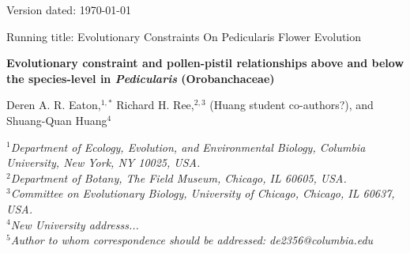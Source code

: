 \documentclass[12pt,letterpaper]{article}
\begin{document}
\begin{flushright}
Version dated: \today
\end{flushright}
\bigskip

\noindent Running title: Evolutionary Constraints On Pedicularis Flower Evolution \\

\begin{center}

{\Large \textbf{Evolutionary constraint and pollen-pistil 
relationships above and below the species-level in 
\emph{Pedicularis} (Orobanchaceae)}

\bigskip
\medskip

{\large Deren A. R. Eaton,$^{1,*}$
  Richard H. Ree,$^{2,3}$
  (Huang student co-authors?), and 
  Shuang-Quan Huang$^{4}$}}

\medskip
\end{center}

{\it \small
\noindent 
$^1$Department of Ecology, Evolution, and Environmental Biology, Columbia University, New York, NY 10025, USA. \\
\noindent $^2$Department of Botany, The Field Museum, Chicago, IL 60605, USA. \\
\noindent $^3$Committee on Evolutionary Biology, University of Chicago, Chicago, IL 60637, USA. \\
\noindent $^4$New University addresss... \\
\noindent $^5$Author to whom correspondence should be addressed: de2356@columbia.edu \\  }
\bigskip
\end{document}

